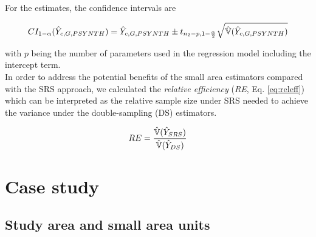 For the \psynth{} estimates, the confidence intervals are


\begin{equation}\label{ci_2phase_psynth}
CI_{1-\alpha}(\hat{Y}_{c,G,PSYNTH})=\hat{Y}_{c,G,PSYNTH} \pm t_{n_{2}-p, 1-\frac{\alpha}{2}}\sqrt{\hat{\mathbb{V}}(\hat{Y}_{c,G,PSYNTH})}
\end{equation}

\noindent with $p$ being the number of parameters used in the regression model including the intercept term.\\

In order to address the potential benefits of the small area estimators compared with the SRS approach, we calculated the \textit{relative efficiency} (\textit{RE}, Eq. \ref{eq:releff}) which can be interpreted as the relative sample size under SRS needed to achieve the variance under the double-sampling (DS) estimators.

\begin{equation}\label{eq:releff}
RE=\frac{\hat{\mathbb{V}}(\hat{Y}_{SRS})}{\hat{\mathbb{V}}(\hat{Y}_{DS})}
\end{equation}


\section{Case study}
\label{sec:CaseStudy}


\subsection{Study area and small area units}
\label{sec:studyarea}

